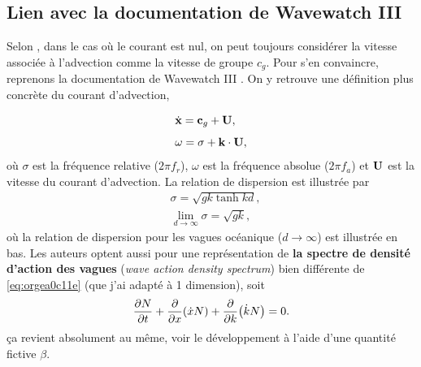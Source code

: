 \documentclass[10pt]{article}
\numberwithin{equation}{section}
\newcommand{\grande}{\vphantom{\frac{1}{xx}}}
\begin{document}
\subsection{Lien avec la documentation de Wavewatch III}
\label{sec:orge687b06}
Selon \Textcite{william2013wave}, dans le cas où le courant est nul, on peut toujours considérer la vitesse associée à l'advection comme la vitesse de groupe \(c_g\).
Pour s'en convaincre, reprenons la documentation de Wavewatch III \autocite[p.11 et 13]{wwiii2016user}.
On y retrouve une définition plus concrète du courant d'advection,
\begin{subequations}
\begin{align}
   & \dot{\vb{x}} = \vb{c}_g + \vb{U},\grande\\
   & \omega = \sigma + \vb{k}\cdot \vb{U},
\end{align}
\end{subequations}
où \(\sigma\) est la fréquence relative (\(2\pi f_r\)), \(\omega\) est la fréquence absolue (\(2\pi f_a\)) et \(\vb{U}\) est la vitesse du courant d'advection. 
La relation de dispersion \autocite[voir][p.11]{wwiii2016user} est illustrée par
\begin{subequations}
\label{eq:org282f871}
\begin{align}
   &\sigma = \sqrt{ gk \tanh kd }, \\
   &\lim_{d\rightarrow\infty} \sigma = \sqrt{gk},
\end{align}
\end{subequations}
où la relation de dispersion pour les vagues océanique (\(d\rightarrow\infty\)) est illustrée en bas.
Les auteurs optent aussi pour une représentation de \textbf{la spectre de densité d'action des vagues} (\emph{wave action density spectrum}) bien différente de \ref{eq:orgea0c11e} (que j'ai adapté à 1 dimension), soit
\begin{equation}
   \pdv{N}{t} + \pdv{}{x}\qty(\dot{x} N) + \pdv{}{k} \qty(\dot{k}N)  = 0.
\end{equation}
ça revient absolument au même, voir le développement à l'aide d'une quantité fictive \(\beta\).\bigskip
\end{document}

